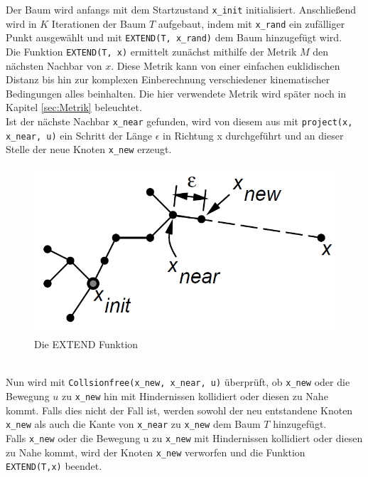 Der Baum wird anfangs mit dem Startzustand \verb|x_init| initialisiert. Anschließend wird in $K$ Iterationen der Baum $T$ aufgebaut, indem mit \verb|x_rand| ein zufälliger Punkt ausgewählt und mit \verb|EXTEND(T, x_rand)| dem Baum hinzugefügt wird. \\
Die Funktion \verb|EXTEND(T, x)| ermittelt zunächst mithilfe der Metrik $M$ den nächsten Nachbar von $x$. Diese Metrik kann von einer einfachen euklidischen Distanz bis hin zur komplexen Einberechnung verschiedener kinematischer Bedingungen alles beinhalten. Die hier verwendete Metrik wird später noch in Kapitel \ref{sec:Metrik} beleuchtet. \\
Ist der nächste Nachbar \verb|x_near| gefunden, wird von diesem aus mit \verb|project(x, x_near, u)|  ein Schritt der Länge  $\epsilon$ in Richtung x durchgeführt und an dieser Stelle der neue Knoten \verb|x_new| erzeugt. 
\begin{figure}
\centering
\includegraphics[scale=0.5]{Bilder/Extend.png} 
\caption{Die EXTEND Funktion \citep{Lav00} }
\label{fig3}
\end{figure} \\
Nun wird mit \verb|Collsionfree(x_new, x_near, u)| überprüft, ob \verb|x_new| oder die Bewegung $u$ zu \verb|x_new| hin mit Hindernissen kollidiert oder diesen zu Nahe kommt. Falls dies nicht der Fall ist, werden sowohl der neu entstandene Knoten \verb|x_new| als auch die Kante von \verb|x_near| zu \verb|x_new| dem Baum $T$ hinzugefügt. \\
Falls  \verb|x_new| oder die Bewegung u zu  \verb|x_new| mit Hindernissen kollidiert oder diesen zu Nahe kommt, wird der Knoten  \verb|x_new| verworfen und die Funktion \verb|EXTEND(T,x)| beendet.\\

